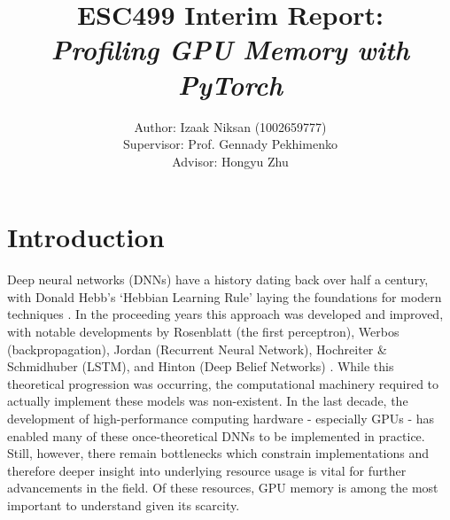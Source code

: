 \documentclass[12pt,letterpaper]{article}
\begin{document}
\title{\textbf{ESC499 Interim Report:\\ \textit{Profiling GPU Memory with PyTorch}}}

\author{Author: Izaak Niksan (1002659777)\\
Supervisor: Prof. Gennady Pekhimenko\\
Advisor: Hongyu Zhu
}

\maketitle
\thispagestyle{empty}
\newpage
\tableofcontents
\newpage

\listoffigures
\newpage 

\section{Introduction}
Deep neural networks (DNNs) have a history dating back over half a century, with Donald Hebb's \enquote*{Hebbian Learning Rule} laying the foundations for modern techniques \cite{dnn_history}. In the proceeding years this approach was developed and improved, with notable developments by Rosenblatt (the first perceptron), Werbos (backpropagation), Jordan (Recurrent Neural Network), Hochreiter \& Schmidhuber (LSTM), and Hinton (Deep Belief Networks) \cite{dnn_history}. While this theoretical progression was occurring, the computational machinery required to actually implement these models was non-existent. In the last decade, the development of high-performance computing hardware - especially GPUs - has enabled many of these once-theoretical DNNs to be implemented in practice. Still, however, there remain bottlenecks which constrain implementations and therefore deeper insight into underlying resource usage is vital for further advancements in the field. Of these resources, GPU memory is among the most important to understand given its scarcity. \par 
\end{document}
